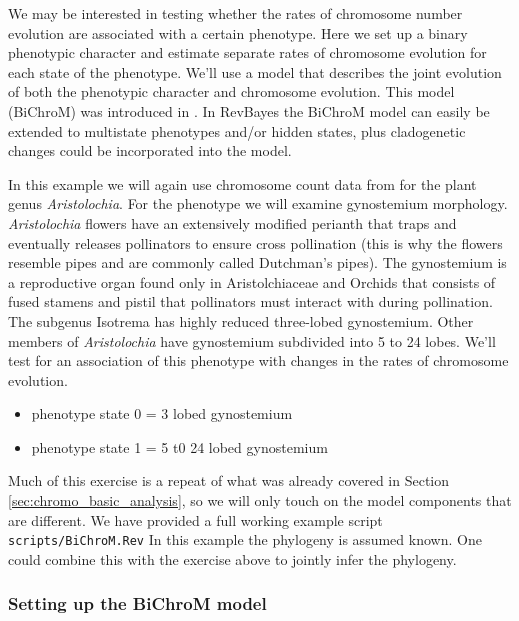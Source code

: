We may be interested in testing whether the rates of chromosome number evolution
are associated with a certain phenotype.
Here we set up a binary phenotypic character and estimate separate rates of chromosome
evolution for each state of the phenotype. 
We'll use a model that describes the joint evolution of both the
phenotypic character and chromosome evolution. This model (BiChroM) was introduced in \citet{zenil2017testing}. In RevBayes the BiChroM model can easily be extended to multistate phenotypes and/or 
hidden states, plus cladogenetic changes could be incorporated into the model.

In this example we will again use chromosome count data from \citet{ohi2006molecular} for the plant 
genus \textit{Aristolochia}. 
For the phenotype we will examine gynostemium morphology. \textit{Aristolochia} flowers have an extensively 
modified perianth that traps and eventually releases pollinators to ensure cross pollination 
(this is why the flowers resemble pipes and are commonly called Dutchman's pipes). The gynostemium 
is a reproductive organ found only in Aristolchiaceae and Orchids that consists of fused stamens 
and pistil that pollinators must interact with during pollination. The subgenus Isotrema has highly
reduced three-lobed gynostemium. Other members of \textit{Aristolochia} have gynostemium subdivided into
5 to 24 lobes. We'll test for an association of this phenotype with changes in the rates of 
chromosome evolution. 
\begin{itemize}
\item phenotype state 0 = 3 lobed gynostemium
\item phenotype state 1 = 5 t0 24 lobed gynostemium
\end{itemize}
Much of this exercise is a repeat of what was already covered in Section \ref{sec:chromo_basic_analysis},
so we will only touch on the model components that are different.
We have provided a full working example script \texttt{scripts/BiChroM.Rev}
In this example the phylogeny is assumed known. One could combine this with the exercise above
to jointly infer the phylogeny.

\subsubsection{Setting up the BiChroM model}

